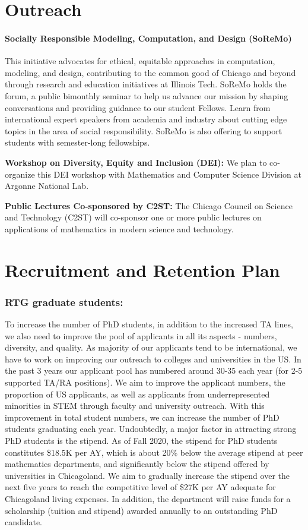 \documentclass[11pt]{NSFamsart}
\newcommand{\bfparagraph}[1]{\paragraph{\textbf{\textup{#1}}}}
\begin{document}
\section{Outreach}

\bfparagraph{Socially Responsible Modeling, Computation, and Design
(SoReMo)}
This initiative advocates for ethical, equitable approaches in computation,
modeling, and design, contributing to the common good of Chicago and
beyond through research and education initiatives at Illinois Tech.
SoReMo holds the forum,  a public bimonthly seminar to help us advance
our mission by shaping conversations and providing guidance to our
student Fellows. Learn from international expert speakers from academia
and industry about cutting edge topics in the area of social responsibility.
SoReMo is also offering to support students with semester-long fellowships.   

\noindent
\textbf{Workshop on Diversity, Equity and Inclusion (DEI):}
We plan to co-organize this DEI workshop with Mathematics and Computer Science Division at   Argonne National Lab. 

\noindent
\textbf{Public Lectures Co-sponsored by  C2ST:}  The Chicago Council on Science and Technology (C2ST) will co-sponsor   one or more public lectures on applications   of mathematics in modern science and technology.


\section{Recruitment and Retention Plan}

  \subsubsection*{RTG graduate students:} 
To increase the number of PhD students, in addition to the increased TA lines, we also need to improve the pool of applicants in all its aspects - numbers, diversity, and quality. As majority of our applicants tend to be international, we have to work on improving our outreach to colleges and universities in the US. In the past 3 years our applicant pool has numbered around 30-35 each year (for 2-5 supported TA/RA positions). We aim to improve the applicant numbers, the proportion of US applicants, as well as applicants from underrepresented minorities in STEM through faculty and university outreach. With this improvement in total student numbers, we can increase the number of PhD students graduating each year.
Undoubtedly, a major factor in attracting strong PhD students is the stipend. As of Fall 2020, the stipend for PhD students constitutes \$18.5K per AY, which is about 20\% below the average stipend at peer mathematics departments, and significantly below the stipend offered by universities in Chicagoland. We aim to gradually increase the stipend over the next five years to reach the competitive level of \$27K per AY adequate for Chicagoland living expenses. In addition, the department will raise funds for a scholarship (tuition and stipend) awarded annually to an outstanding PhD candidate.
\end{document}
